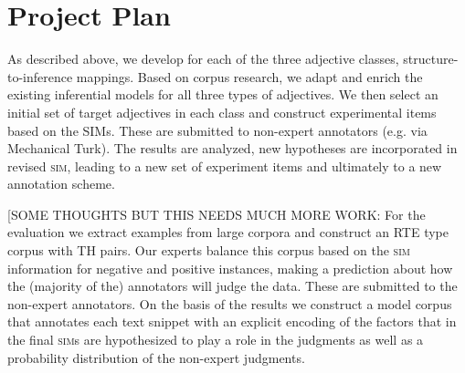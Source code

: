 \documentclass[10pt]{article}
\begin{document}


\vspace {-7mm}

\section{Project Plan}

\vspace {-3mm}

As described above, we develop for each of the three adjective classes, structure-to-inference mappings. Based on corpus research, we adapt and enrich the existing inferential models for all three types of adjectives. We then select an initial set of target adjectives in each class and construct experimental items based on the SIMs. These are submitted to non-expert annotators (e.g. via Mechanical Turk). The results are analyzed, new hypotheses are incorporated in revised \textsc{sim}, leading to a new set of experiment items and ultimately to a new annotation scheme. 

[SOME THOUGHTS BUT THIS NEEDS MUCH MORE WORK: For the evaluation we extract examples from large corpora and construct an RTE type corpus with TH pairs. Our experts balance this corpus based on the \textsc{sim} information for negative and positive instances, making a prediction about how the (majority of the) annotators will judge the data. These are submitted to the non-expert annotators. On the basis of the results we construct a model corpus that annotates each text snippet with an explicit encoding of the factors that in the final \textsc{sim}s are hypothesized to play a role in the judgments as well as a probability distribution of the non-expert judgments.  
\end{document}
